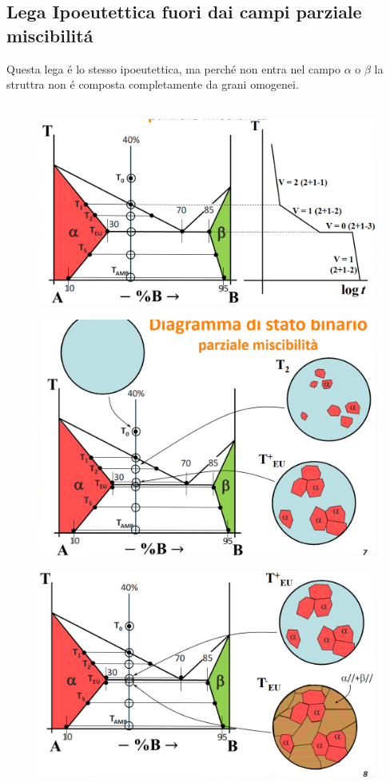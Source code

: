 \documentclass{article}
\begin{document}
{        \subsection{Lega Ipoeutettica fuori dai campi parziale miscibilit\'a}
            Questa lega \'e lo stesso ipoeutettica, ma perch\'e non entra nel campo $\alpha$ o $\beta$ la struttra non \'e composta completamente da grani omogenei.\\ \\
            \begin{figure}[h!]
                \centering
                \includegraphics[width=.8\linewidth]{Diagramma per la lega ipoeutettica fuori dal campo alpha con curva di raffreddamento.png}
            \end{figure}
            \begin{figure}[h!]
                \centering
                \includegraphics[width=.8\linewidth]{Diagramma per la lega ipoeutettica fuori dal campo alpha e cambio di struttura prima di TEU.png}
            \end{figure}
            \begin{figure}[h!]
                \centering
                \includegraphics[width=.8\linewidth]{Diagramma per la lega ipoeutettica fuori dal campo alpha e cambio di struttura dopo TEU.png}

\end{figure}}
\end{document}
